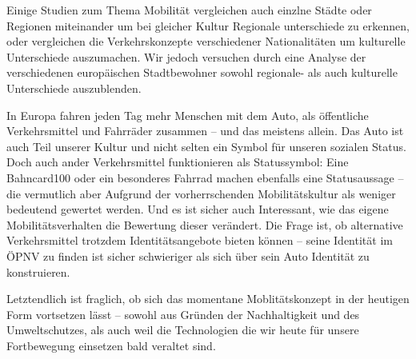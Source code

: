 	Einige Studien zum Thema Mobilität vergleichen auch einzlne Städte oder Regionen miteinander \parencite{fh7, widmer} um bei gleicher Kultur Regionale unterschiede zu erkennen, oder vergleichen die Verkehrskonzepte verschiedener Nationalitäten um kulturelle Unterschiede auszumachen.
	Wir jedoch versuchen durch eine Analyse der verschiedenen europäischen Stadtbewohner sowohl regionale- als auch kulturelle Unterschiede auszublenden.

	In Europa fahren jeden Tag mehr Menschen mit dem Auto, als öffentliche Verkehrsmittel und Fahrräder zusammen – und das meistens allein.
	Das Auto ist auch Teil unserer Kultur und nicht selten ein Symbol für unseren sozialen Status.
	Doch auch ander Verkehrsmittel funktionieren als Statussymbol: Eine Bahncard100 oder ein besonderes Fahrrad machen ebenfalls eine Statusaussage – die vermutlich aber Aufgrund der vorherrschenden Mobilitätskultur als weniger bedeutend gewertet werden.
	Und es ist sicher auch Interessant, wie das eigene Mobilitätsverhalten die Bewertung dieser verändert.
	Die Frage ist, ob alternative Verkehrsmittel trotzdem Identitätsangebote bieten können – seine Identität im ÖPNV zu finden ist sicher schwieriger als sich über sein Auto Identität zu konstruieren.

	Letztendlich ist fraglich, ob sich das momentane Moblitätskonzept in der heutigen Form vortsetzen lässt – sowohl aus Gründen der Nachhaltigkeit und des Umweltschutzes, als auch weil die Technologien die wir heute für unsere Fortbewegung einsetzen bald veraltet sind.

	

